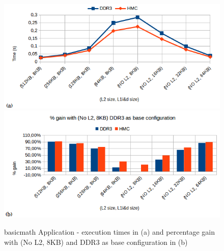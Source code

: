 \documentclass{sig-alternate-05-2015}
\begin{document}
\begin{figure}
	\centering
	\includegraphics[scale=0.38]{images/graficos/basicmath_}\includegraphics[scale=0.38]{images/graficos/basicmath_perc_}\caption{\label{fig:basicmath-Application}basicmath Application - execution
		times in (a) and percentage gain with (No L2, 8KB) and DDR3 as base configuration
		in (b)}
\end{figure}
\end{document}
